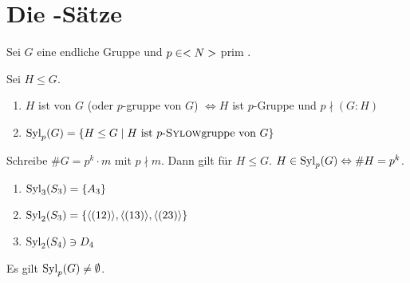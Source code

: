 \section{Die -Sätze}
Sei $G$ eine endliche Gruppe und $p \in <N>$ prim
.
\begin{definition}
	Sei $H \leq G$.
	\begin{enumerate}[label=(\alph*)]
		\item $H$ ist  von $G$ (oder $p$-gruppe von $G$) $\Leftrightarrow H$ ist $p$-Gruppe und $p \nmid (G: H)$
		\item $\operatorname{Syl}_p(G) = \{H \leq G \mid H \text{ ist } p\text{-\textsc{Sylow}gruppe von } G\}$
	\end{enumerate}
\end{definition}

\begin{remark}
	Schreibe $\#G = p^k \cdot m$ mit $p \nmid m$. Dann gilt für $H \leq G$. $H \in \operatorname{Syl}_p(G) \Leftrightarrow \#H=p^k$.
\end{remark}

\begin{example}
	\begin{enumerate}[label=(\alph*)]
		\item $\operatorname{Syl}_3(S_3) = \{A_3\}$
		\item $\operatorname{Syl}_2(S_3) = \{\langle(12)\rangle , \langle(13)\rangle, \langle(23)\rangle\}$
		\item $\operatorname{Syl}_2(S_4) \ni D_4$
	\end{enumerate}
\end{example}

\begin{proposition}
	Es gilt $\operatorname{Syl}_p(G) \neq \emptyset$.
\end{proposition}

